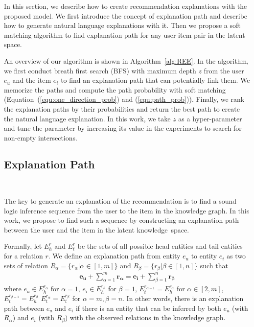 \documentclass[algorithms,article,accept,moreauthors,pdftex,10pt,a4paper]{Definitions/mdpi}
\begin{document}
In this section, we describe how to create recommendation explanations with the proposed model.
We first introduce the concept of explanation path and describe how to generate natural language explanations with it.
Then we propose a soft matching algorithm to find explanation path for any user-item pair in the latent space.

An overview of our algorithm is shown in Algorithm~\ref{alg:REE}.
In the algorithm, we first conduct breath first search (BFS) with maximum depth $z$ from the user $e_u$ and the item $e_i$ to find an explanation path that can potentially link them. 
We memorize the paths and compute the path probability with soft matching (Equation~(\ref{equ:one_direction_prob}) and (\ref{equ:path_prob})).
Finally, we rank the explanation paths by their probabilities and return the best path to create the natural language explanation. In this work, we take $z$ as a hyper-parameter and tune the parameter by increasing its value in the experiments to search for non-empty intersections.


\subsection{Explanation Path}~\label{sec:path}

The key to generate an explanation of the recommendation is to find a sound logic inference sequence from the user to the item in the knowledge graph.
In this work, we propose to find such a sequence by constructing an explanation path between the user and the item in the latent knowledge~space.

Formally, let $E_h^r$ and $E_t^r$ be the sets of all possible head entities and tail entities for a relation $r$. 
We define an explanation path from entity $e_u$ to entity $e_i$ as two sets of relation $R_{\alpha} = \{r_{\alpha} | \alpha \in [1,m]\}$ and $R_{\beta} = \{r_{\beta} | \beta \in [1,n]\}$ such that
\begin{equation}
\begin{split}
\bm{e_u} + \sum_{\alpha=1}^m \bm{r_{\alpha}} = \bm{e_i} + \sum_{\beta=1}^n \bm{r_{\beta}}
\end{split}
\label{equ:path}
\end{equation}
where $e_u \!\in\! E_h^{r_{\alpha}}$ for $\alpha\!=\!1$, $e_i \!\in\! E_h^{r_{\beta}}$ for $\beta\!=\!1$, $E_t^{r_{\alpha-1}} \!=\! E_h^{r_{\alpha}}$ for $\alpha \!\in\! [2,m]$, $E_t^{r_{\beta-1}}\! =\! E_h^{r_{\beta}}$  $E_t^{r_{\alpha}} \!=\! E_t^{r_{\beta}}$ for $\alpha\!=\!m, \beta\!=\!n$.
In other words, there is an explanation path between $e_u$ and $e_i$ if there is an entity that can be inferred by both $e_u$ (with $R_{\alpha}$) and $e_i$ (with $R_{\beta}$) with the observed relations in the knowledge graph.
\end{document}
